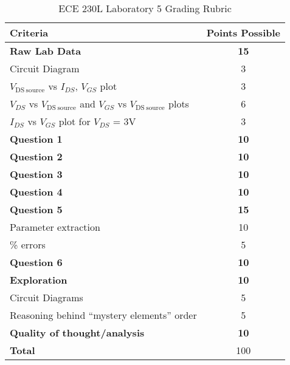 \documentclass[12pt]{../manual}
\begin{document}
%
\newpage
{}
{}
\hspace{0pt}
\vfill %
\begin{table}[ht!]
\caption{ECE 230L Laboratory 5 Grading Rubric}
\centering
\begin{tabular}{l|c} \hline
Criteria & Points Possible \\ \hline \hline
\textbf{Raw Lab Data} 							& \textbf{15} \\
Circuit Diagram 								& 3 \\
$V_{\mathrm{DS~source}}$ vs $I_{DS}$, $V_{GS}$ plot & 3 \\
$V_{DS}$ vs $V_{\mathrm{DS~source}}$ and $V_{GS}$ vs $V_{\mathrm{DS~source}}$ plots 	& 6 \\
$I_{DS}$ vs $V_{GS}$ plot for $V_{DS}$ = 3V 		& 3 \\ \hline
\textbf{Question 1} 							& \textbf{10} \\ \hline
\textbf{Question 2} 							& \textbf{10} \\ \hline
\textbf{Question 3} 							& \textbf{10} \\ \hline
\textbf{Question 4} 							& \textbf{10} \\ \hline
\textbf{Question 5} 							& \textbf{15} \\
Parameter extraction							& 10 \\ 
\% errors										& 5 \\ \hline
\textbf{Question 6} 							& \textbf{10} \\ \hline
\textbf{Exploration} 							& \textbf{10} \\
Circuit Diagrams								& 5 \\
Reasoning behind ``mystery elements'' order		& 5 \\ \hline
\textbf{Quality of thought/analysis} 			& \textbf{10} \\ \hline \hline
\textbf{Total} 									& 100 \\ \hline
\end{tabular}
\end{table}
\vfill %
\end{document}
